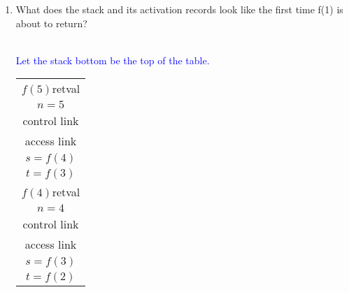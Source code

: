 \documentclass[10pt]{article}
\begin{document}
\begin{enumerate}
\begin{enumerate}
{
                }
          \item What does the stack and its activation records look like the first time f(1) is about to return?
                \textcolor{blue}{\\
                  Let the stack bottom be the top of the table.\\
                  \begin{tabular}{|c|}
                    \hline
                    \hline
                    \\
                    \hline
                    $f(5)$retval   \\
                    \hline
                    $n=5$          \\
                    \hline
                    control link   \\
                    \hline
                    access link    \\
                    \hline
                    $s=f(4)$       \\
                    \hline
                    $t=f(3)$       \\
                    \hline
                    $f(4)$retval   \\
                    \hline
                    $n=4$          \\
                    \hline
                    control link   \\
                    \hline
                    access link    \\
                    \hline
                    $s=f(3)$       \\
                    \hline
                    $t=f(2)$       \\

\end{tabular}}
\end{enumerate}
\end{enumerate}
\end{document}
